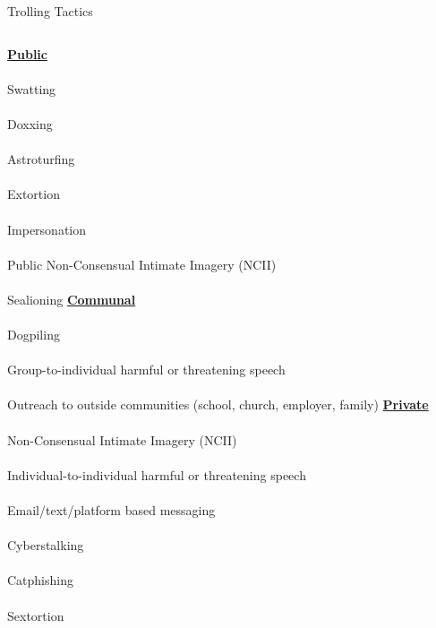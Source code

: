 \documentclass[nobackground,dvipsnames,table,aspectratio=169]{beamer}
\begin{document}
\begin{frame}{Trolling Tactics}
    \begin{columns}[T]
            \centering
            \large{\underline{\textbf{Public}}}\\~\\

            \small
            Swatting\\~\\
            Doxxing\\~\\
            Astroturfing\\~\\
            Extortion\\~\\
            Impersonation\\~\\
            Public Non-Consensual Intimate Imagery (NCII)\\~\\
            Sealioning
            \centering
            \large{\underline{\textbf{Communal}}}\\~\\

            \small
            Dogpiling\\~\\
            Group-to-individual harmful or threatening speech\\~\\
            Outreach to outside communities (school, church, employer, family)
            \centering
            \large{\underline{\textbf{Private}}}\\~\\

            \small
            Non-Consensual Intimate Imagery (NCII)\\~\\
            Individual-to-individual harmful or threatening speech\\~\\
            Email/text/platform based messaging\\~\\
            Cyberstalking\\~\\
            Catphishing\\~\\
            Sextortion
    \end{columns}
\end{frame}
\end{document}
